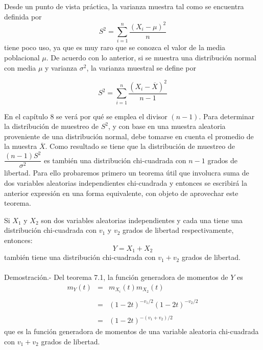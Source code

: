 Desde un punto de vista práctica, la varianza muestra tal como se encuentra definida por 
$$S^2=\sum\limits_{i=1}^n \dfrac{(X_i-\mu)^2}{n}$$
tiene poco uso, ya que es muy raro que se conozca el valor de la media poblacional $\mu$. De acuerdo con lo anterior, si se muestra una distribución normal con media $\mu$ y varianza $\sigma^2$, la varianza muestral se define por
\begin{tcolorbox}
    $$S^2=\sum_{i=1}^n \dfrac{\left(X_i-\overline{X}\right)^2}{n-1}$$
\end{tcolorbox}
En el capítulo 8 se verá por qué se emplea el divisor $(n-1)$. Para determinar la distribución de muestreo de $S^2$, y con base en una muestra aleatoria proveniente de una distribución normal, debe tomarse en cuenta el promedio de la muestra $\overline{X}$. Como resultado se tiene que la distribución de muestreo de $\dfrac{(n-1)S^2}{\sigma^2}$ es también una distribución chi-cuadrada con $n-1$ grados de libertad. Para ello probaremos primero un teorema útil que involucra suma de dos variables aleatorias independientes chi-cuadrada y entonces se escribirá la anterior expresión en una forma equivalente, con objeto de aprovechar este teorema.

\begin{teo}
    Si $X_1$ y $X_2$ son dos variables aleatorias independientes y cada una tiene una distribución chi-cuadrada con $v_1$ y $v_2$ grados de libertad respectivamente, entonces:
    $$Y=X_1+X_2$$
    también tiene una distribución chi-cuadrada con $v_1+v_2$ grados de libertad.\\\\
	Demostración.-\; Del teorema 7.1, la función generadora de momentos de $Y$ es
	$$
	\begin{array}{rcl}
	    m_Y(t) &=& m_{X_i}(t)m_{X_2}(t)\\\\
		   &=& (1-2t)^{-v_1/2} (1-2t)^{-v_2/2}\\\\
		   &=& (1-2t)^{-(v_1+v_2)/2}
	\end{array}
	$$
	que es la función generadora de momentos de una variable aleatoria chi-cuadrada con $v_1+v_2$ grados de libertad.
\end{teo}


